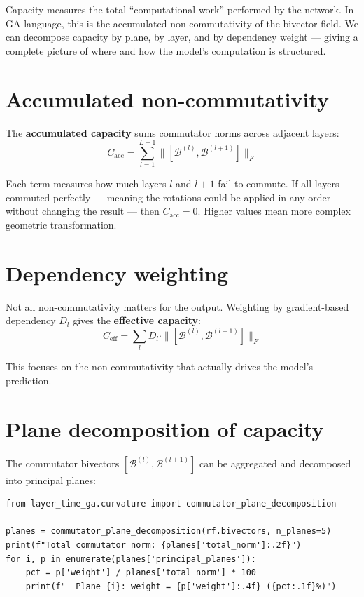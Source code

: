 \documentclass[11pt, twoside, openright]{memoir}
\newcommand{\bivec}[1]{\mathcal{B}^{(#1)}}  %
\begin{document}
\begin{whycare}
Capacity measures the total ``computational work'' performed by the
network.  In GA language, this is the accumulated non-commutativity
of the bivector field.  We can decompose capacity by plane, by layer,
and by dependency weight --- giving a complete picture of where and how
the model's computation is structured.
\end{whycare}

\section{Accumulated non-commutativity}

The \textbf{accumulated capacity} sums commutator norms across adjacent
layers:
\[
  C_{\mathrm{acc}} = \sum_{l=1}^{L-1} \|[\bivec{l}, \bivec{l+1}]\|_F
\]

Each term measures how much layers $l$ and $l+1$ fail to commute.  If
all layers commuted perfectly --- meaning the rotations could be applied in any order without changing the result --- then $C_{\mathrm{acc}} = 0$.
Higher values mean more complex geometric transformation.

\section{Dependency weighting}

Not all non-commutativity matters for the output.  Weighting by
gradient-based dependency $D_l$ gives the \textbf{effective capacity}:
\[
  C_{\mathrm{eff}} = \sum_{l} D_l \cdot \|[\bivec{l}, \bivec{l+1}]\|_F
\]

This focuses on the non-commutativity that actually drives the model's
prediction.

\section{Plane decomposition of capacity}

The commutator bivectors $[\bivec{l}, \bivec{l+1}]$ can be aggregated
and decomposed into principal planes:

\begin{lstlisting}[caption={Capacity with plane decomposition}]
from layer_time_ga.curvature import commutator_plane_decomposition

planes = commutator_plane_decomposition(rf.bivectors, n_planes=5)
print(f"Total commutator norm: {planes['total_norm']:.2f}")
for i, p in enumerate(planes['principal_planes']):
    pct = p['weight'] / planes['total_norm'] * 100
    print(f"  Plane {i}: weight = {p['weight']:.4f} ({pct:.1f}%)")
\end{lstlisting}
\end{document}
